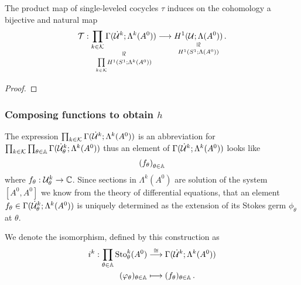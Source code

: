 \begin{cor}
  The product map of single-leveled cocycles $\tau$ induces on the cohomology
  a bijective and natural map
  \[
    \cT:
    \underset{\underset{k\in\cK}\prod H^1(S^1;\Lambda^k(A^0))}{%
      \underset{\text{\rotatebox[origin=c]{-90}{$\cong$}}}{%
        \prod_{k\in\cK}\Gamma(\dot\cU^k;\Lambda^k(A^0))}}
    \longrightarrow
    \underset{H^1(S^1;\Lambda(A^0))}{%
      \underset{\text{\rotatebox[origin=c]{-90}{$\cong$}}}{%
        H^1(\cU;\Lambda(A^0))}}\,.
  \]
\end{cor}
\begin{proof}
  \TODO{}
\end{proof}
\subsubsection{Composing functions to obtain $h$}
The expression $\prod_{k\in\mathcal{K}}\Gamma(\dot{\mathcal{U}}^k;\Lambda^k(A^0))$ is an
abbreviation for
$\prod_{k\in\mathcal{K}}\prod_{\theta\in\mathbb{A}}\Gamma(\dot{\mathcal{U}}_\theta^k;\Lambda^k(A^0))$
thus an element of $\Gamma(\dot{\mathcal{U}}^k;\Lambda^k(A^0))$ looks like
\[
  \left(f_\theta\right)_{\theta\in\mathbb{A}}
\]
where $f_\theta:\mathcal{U}_\theta^k\to\mathbb{C}$.
Since sections in $\Lambda^k(A^0)$ are solution of the system $[A^0,A^0]$ we
know from the theory of differential equations\TODO[source?], that an element
$f_\theta\in\Gamma(\dot{\mathcal{U}}_\theta^k;\Lambda^k(A^0))$ is uniquely determined as
the extension of its Stokes germ $\phi_\theta$ at $\theta$.
\begin{comment}
  ODE-Theory, says, that a germ defines a solution in a \textbf{neighbourhood},
  why is
  \[
    \substack{the\\neighbourhood}=\cU_\theta^k \,?
  \]
  \begin{itemize}
    \item[\cite{Loday1994} p.872] \dots cononical extansion of germs to their
      natural arc of definition.
  \end{itemize}
\end{comment}
We denote the isomorphism, defined by this construction as
\begin{align*}
  i^k: \prod_{\theta\in\mathbb{A}}\operatorname{Sto}_\theta^k(A^0)
  &\overset{\cong}\longrightarrow \Gamma(\dot{\mathcal{U}}^k;\Lambda^k(A^0))
\\(\varphi_\theta)_{\theta\in\mathbb{A}} &\longmapsto (f_\theta)_{\theta\in\mathbb{A}}
  \,.
\end{align*}


